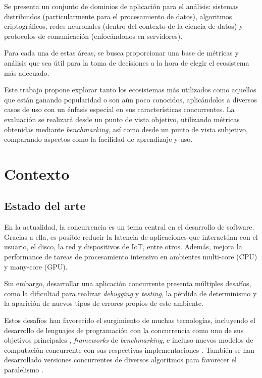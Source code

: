 \documentclass[11pt]{article}
\let\Oldsection\section
\renewcommand{\section}{\FloatBarrier\Oldsection}
\let\Oldsubsection\subsection
\renewcommand{\subsection}{\FloatBarrier\Oldsubsection}
\newcommand{\english}[1]{\textit{#1}}
\begin{document}
Se presenta un conjunto de dominios de aplicación para el análisis: sistemas distribuidos (particularmente para el procesamiento de datos), algoritmos criptográficos, redes neuronales (dentro del contexto de la ciencia de datos) y protocolos de comunicación (enfocándonos en servidores).

Para cada una de estas áreas, se busca proporcionar una base de métricas y análisis que sea útil para la toma de decisiones a la hora de elegir el ecosistema más adecuado.

Este trabajo propone explorar tanto los ecosistemas más utilizados como aquellos que están ganando popularidad o son aún poco conocidos, aplicándolos a diversos casos de uso con un énfasis especial en sus características concurrentes. La evaluación se realizará desde un punto de vista objetivo, utilizando métricas obtenidas mediante \english{benchmarking}, así como desde un punto de vista subjetivo, comparando aspectos como la facilidad de aprendizaje y uso.

\newpage

\section{Contexto}

\subsection{Estado del arte}

En la actualidad, la concurrencia es un tema central en el desarrollo de software. Gracias a ella, es posible reducir la latencia de aplicaciones que interactúan con el usuario, el disco, la red y dispositivos de IoT, entre otros. Además, mejora la performance de tareas de procesamiento intensivo en ambientes multi-core (CPU) y many-core (GPU).

Sin embargo, desarrollar una aplicación concurrente presenta múltiples desafíos, como la dificultad para realizar \textit{debugging} y \textit{testing}, la pérdida de determinismo y la aparición de nuevos tipos de errores propios de este ambiente.

Estos desafíos han favorecido el surgimiento de muchas tecnologías, incluyendo el desarrollo de lenguajes de programación con la concurrencia como uno de sus objetivos principales \cite{rust:ex:fearless_concurrency} \cite{go:ex:concurrency_patterns}, \textit{frameworks} de \textit{benchmarking}, e incluso nuevos modelos de computación concurrente con sus respectivas implementaciones \cite{state_of_the_art:reactors}. También se han desarrollado versiones concurrentes de diversos algoritmos para favorecer el paralelismo \cite{state_of_the_art:huffman_gpu}.
\end{document}

